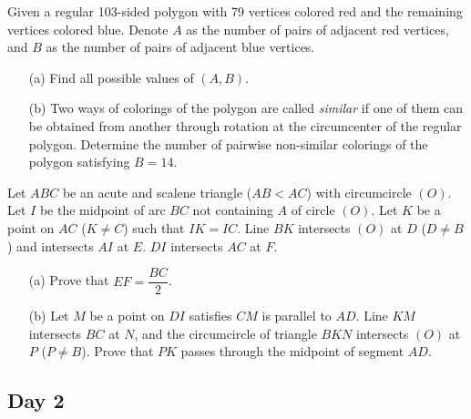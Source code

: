 \documentclass[11pt]{article}
\begin{document}
        \begin{exercise}
            Given a regular 103-sided polygon with 79 vertices colored red and the remaining vertices colored blue. Denote \(A\) as the number of pairs of adjacent red vertices, and \(B\) as the number of pairs of adjacent blue vertices.
            \begin{enumerate}
                \item[(a)] Find all possible values of \((A,B)\).
                \item[(b)] Two ways of colorings of the polygon are called \emph{similar} if one of them can be obtained from another through rotation at the circumcenter of the regular polygon. Determine the number of pairwise non-similar colorings of the polygon satisfying \(B = 14\).
            \end{enumerate}
        \end{exercise}
    
        \boom
    
        \begin{exercise}
            Let \(ABC\) be an acute and scalene triangle (\(AB < AC\)) with circumcircle \((O)\). Let \(I\) be the midpoint of arc \(BC\) not containing \(A\) of circle \((O)\). Let \(K\) be a point on \(AC\) (\(K \neq C\)) such that \(IK = IC\). Line \(BK\) intersects \((O)\) at \(D\) (\(D \neq B\)) and intersects \(AI\) at \(E\). \(DI\) intersects \(AC\) at \(F\).
            \begin{enumerate}
                \item[(a)] Prove that \(EF = \dfrac{BC}{2}\).
                \item[(b)] Let \(M\) be a point on \(DI\) satisfies \(CM\) is parallel to \(AD\). Line \(KM\) intersects \(BC\) at \(N\), and the circumcircle of triangle \(BKN\) intersects \((O)\) at \(P\) (\(P \neq B\)). Prove that \(PK\) passes through the midpoint of segment \(AD\).
            \end{enumerate}
        \end{exercise}

    \newpage
    
    \subsection*{Day 2}
\end{document}
